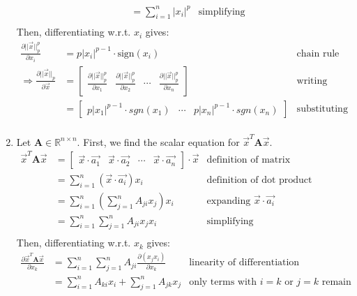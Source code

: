 \documentclass[11pt]{article}
\newcommand{\pd}[2]{\frac{\partial #1}{\partial #2}}
\begin{document}
\begin{enumerate}
\begin{align*}
        &= \sum_{i=1}^{n} |x_i|^p & \text{simplifying} \\
    \end{align*}
    Then, differentiating w.r.t. $x_i$ gives:
    \begin{align*}
        \pd{||\vec{x}||_p^p}{x_i} &= p |x_i|^{p - 1} \cdot \text{sign}(x_i) & \text{chain rule} \\
        \Rightarrow \pd{||\vec{x}||_p}{\vec{x}} &= \begin{bmatrix}
            \pd{||\vec{x}||_p^p}{x_1} & \pd{||\vec{x}||_p^p}{x_2} & \cdots & \pd{||\vec{x}||_p^p}{x_n}
        \end{bmatrix} & \text{writing derivative in vector form} \\
        &= \begin{bmatrix}
            p |x_1|^{p - 1} \cdot sgn(x_1) & \cdots & p |x_n|^{p - 1} \cdot sgn(x_n)
        \end{bmatrix} & \text{substituting previous result} \\
    \end{align*}
    \item Let $\textbf{A} \in \mathbb{R}^{n \times n}$. First, we find the scalar equation for $\vec{x}^T \textbf{A} \vec{x}$.
    \begin{align*}
        \vec{x}^T \textbf{A} \vec{x} &= \begin{bmatrix}
            \vec{x} \cdot \vec{a_1} & \vec{x} \cdot \vec{a_2} & \cdots & \vec{x} \cdot \vec{a_n}
        \end{bmatrix} \cdot \vec{x} & \text{definition of matrix multiplication} \\
        &= \sum_{i=1}^{n} (\vec{x} \cdot \vec{a_i}) x_i & \text{definition of dot product} \\
        &= \sum_{i=1}^{n} \left( \sum_{j=1}^{n} A_{ji} x_j \right) x_i & \text{expanding } \vec{x} \cdot \vec{a_i} \\
        &= \sum_{i=1}^{n} \sum_{j=1}^{n} A_{ji} x_j x_i & \text{simplifying} \\
    \end{align*}
    Then, differentiating w.r.t. $x_k$ gives:
    \begin{align*}
        \pd{\vec{x}^T \textbf{A} \vec{x}}{x_k} &= \sum_{i=1}^{n} \sum_{j=1}^{n} A_{ji} \pd{(x_j x_i)}{x_k} & \text{linearity of differentiation} \\
        &= \sum_{i=1}^{n} A_{ki} x_i + \sum_{j=1}^{n} A_{jk} x_j & \text{only terms with } i = k \text{ or } j = k \text{ remain} \\

\end{align*}
\end{enumerate}
\end{document}
